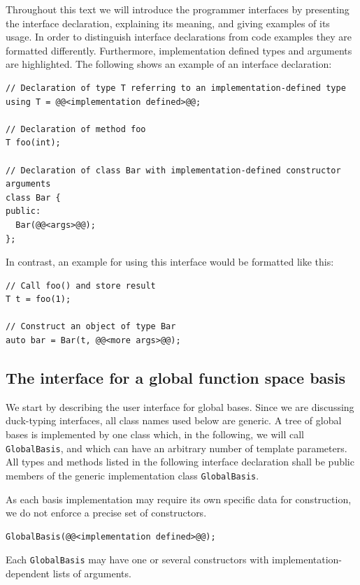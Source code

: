 \documentclass[a4paper,10pt,headings=normal,bibliography=totoc]{scrartcl}
\newcommand{\cpp}[1]{\lstinline[basicstyle=\ttfamily]!#1!}
\begin{document}
Throughout this text we will introduce the programmer interfaces
by presenting the interface declaration, explaining
its meaning, and giving examples of its usage.
In order to distinguish interface declarations
from code examples they are formatted differently.
Furthermore, implementation defined types and arguments are highlighted.
The following shows an example of an interface declaration:
\begin{lstlisting}[style=Interface]
// Declaration of type T referring to an implementation-defined type
using T = @@<implementation defined>@@;

// Declaration of method foo
T foo(int);

// Declaration of class Bar with implementation-defined constructor arguments
class Bar {
public:
  Bar(@@<args>@@);
};
\end{lstlisting}
In contrast,
an example for using this interface would be formatted like this:
\begin{lstlisting}[style=Example]
// Call foo() and store result
T t = foo(1);

// Construct an object of type Bar
auto bar = Bar(t, @@<more args>@@);
\end{lstlisting}


\subsection{The interface for a global function space basis}
We start by describing the user interface for global bases.  Since we are discussing duck-typing interfaces,
all class names used below are generic. A tree of global bases is implemented by one class which,
in the following, we will call \cpp{GlobalBasis}, and which
can have an arbitrary number of template parameters.
All types and methods listed in the following
interface declaration shall be public members of
the generic implementation class \cpp{GlobalBasis}.

As each basis implementation may require its own specific data for construction,
we do not enforce a precise set of constructors.
\begin{lstlisting}[style=Interface]
GlobalBasis(@@<implementation defined>@@);
\end{lstlisting}
Each \cpp{GlobalBasis} may have
one or several constructors with implementation-dependent lists of arguments.
\end{document}
